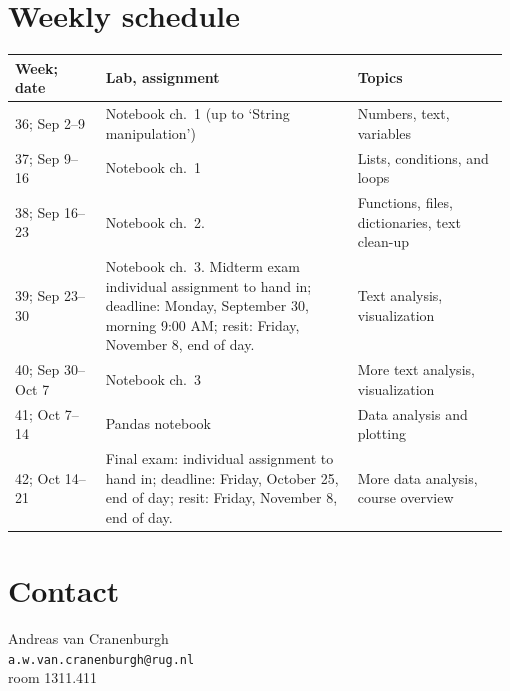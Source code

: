 \documentclass[a4paper,12pt]{article}
\begin{document}
\section{Weekly schedule}\label{sectimetable}
{\raggedright
\begin{longtable}{p{0.18\linewidth} p{0.5\linewidth} p{0.3\linewidth} }
Week; date          & Lab, assignment & Topics \\ \midrule

36; Sep 2--9 &
    Notebook ch.\ 1 (up to `String manipulation')
    & Numbers, text, variables
    \\

37; Sep 9--16     &
    Notebook ch.\ 1
    & Lists, conditions, and loops
    \\

38; Sep 16--23    &
    Notebook ch.\ 2.
    & Functions, files, dictionaries, text clean-up
    \\

39; Sep 23--30    &
    Notebook ch.\ 3.
    Midterm exam individual assignment to hand in;
    deadline: Monday, September 30, morning 9:00 AM;
    resit: Friday, November 8, end of day.
    & Text analysis, visualization
    \\

40; Sep 30--Oct 7 &
    Notebook ch.\ 3
    & More text analysis, visualization
    \\

41; Oct 7--14     &
    Pandas notebook
    & Data analysis and plotting
    \\

42; Oct 14--21    &
    Final exam: individual assignment to hand in;
    deadline: Friday, October 25, end of day;
    resit: Friday, November 8, end of day.
    & More data analysis, course overview
    \\

\end{longtable}
}

\section{Contact}

Andreas van Cranenburgh\\
\texttt{a.w.van.cranenburgh@rug.nl} \\
room 1311.411
\end{document}
